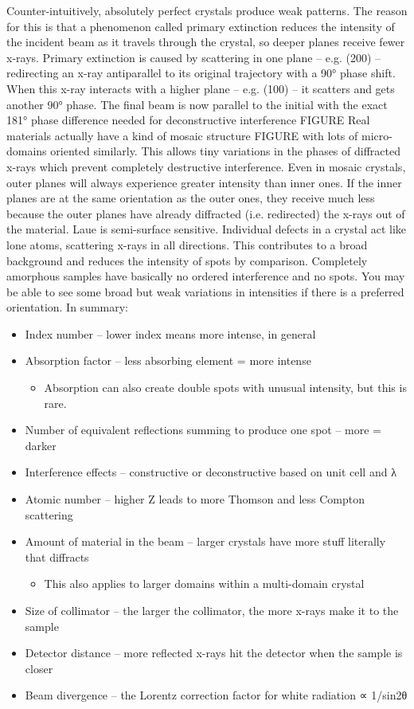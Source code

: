Counter-intuitively, absolutely perfect crystals produce weak patterns. The reason for this is that a phenomenon called primary extinction reduces the intensity of the incident beam as it travels through the crystal, so deeper planes receive fewer x-rays. Primary extinction is caused by scattering in one plane – e.g. (200) – redirecting an x-ray antiparallel to its original trajectory with a \ang{90} phase shift. When this x-ray interacts with a higher plane – e.g. (100) – it scatters and gets another \ang{90} phase. The final beam is now parallel to the initial with the exact \ang{181} phase difference needed for deconstructive interference FIGURE
Real materials actually have a kind of mosaic structure FIGURE with lots of micro-domains oriented similarly. This allows tiny variations in the phases of diffracted x-rays which prevent completely destructive interference.
Even in mosaic crystals, outer planes will always experience greater intensity than inner ones. If the inner planes are at the same orientation as the outer ones, they receive much less because the outer planes have already diffracted (i.e. redirected) the x-rays out of the material. Laue is semi-surface sensitive.
Individual defects in a crystal act like lone atoms, scattering x-rays in all directions. This contributes to a broad background and reduces the intensity of spots by comparison. Completely amorphous samples have basically no ordered interference and no spots. You may be able to see some broad but weak variations in intensities if there is a preferred orientation.
In summary:
\begin{itemize}
    \item Index number – lower index means more intense, in general
    \item Absorption factor – less absorbing element = more intense
    \begin{itemize}
        \item Absorption can also create double spots with unusual intensity, but this is rare.
        \end{itemize}
    \item Number of equivalent reflections summing to produce one spot – more = darker
    \item Interference effects – constructive or deconstructive based on unit cell and λ
    \item Atomic number – higher Z leads to more Thomson and less Compton scattering
    \item Amount of material in the beam – larger crystals have more stuff literally that diffracts
    \begin{itemize}
        \item This also applies to larger domains within a multi-domain crystal
        \end{itemize}
    \item Size of collimator – the larger the collimator, the more x-rays make it to the sample
    \item Detector distance – more reflected x-rays hit the detector when the sample is closer
    \item Beam divergence – the Lorentz correction factor for white radiation ∝ 1/sin2θ
\end{itemize}
